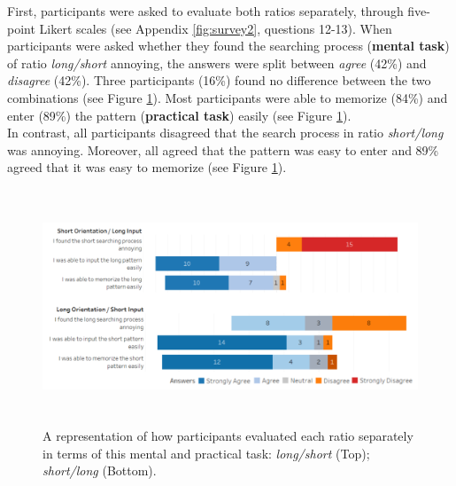First, participants were asked to evaluate both ratios separately, through five-point Likert scales (see Appendix \ref{fig:survey2}, questions 12-13). When participants were asked whether they found the searching process (\textbf{mental task}) of ratio \textit{long/short} annoying, the answers were split between \textit{agree} (42\%) and \textit{disagree} (42\%). Three participants (16\%) found no difference between the two combinations (see Figure \ref{fig:likert}). Most participants were able to memorize (84\%) and enter (89\%) the pattern (\textbf{practical task}) easily (see Figure \ref{fig:likert}). \\
In contrast, all participants disagreed that the search process in ratio \textit{short/long} was annoying. Moreover, all agreed that the pattern was easy to enter and 89\% agreed that it was easy to memorize (see Figure \ref{fig:likert}).\\
 
 \begin{figure}[t!]
\centering
\includegraphics[width=15cm, height=7cm]{Chapters/graphics/likert.PNG}
\caption{A representation of how participants evaluated each ratio separately in terms of this mental and practical task: \textit{long/short} (Top); \textit{short/long} (Bottom).  }
\label{fig:likert}
\end{figure}

